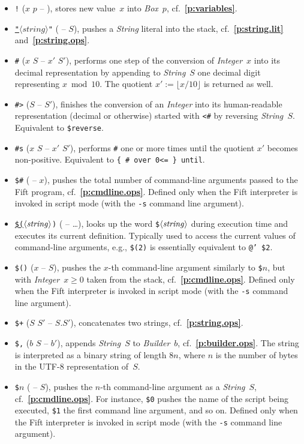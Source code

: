 \documentclass[12pt,oneside]{article}
\def\refpoint#1{{\rm\textbf{\ref{#1}}}}
\let\ptref=\refpoint
\begin{document}
\begin{itemize}
\item {\tt !} ($x$ $p$ -- ), stores new value~$x$ into {\em Box\/}~$p$, cf.~\ptref{p:variables}.
\item {\tt\underline{"}$\langle\textit{string}\rangle$"} ( -- $S$), pushes a {\em String\/} literal into the stack, cf.~\ptref{p:string.lit} and~\ptref{p:string.ops}.
\item {\tt \#} ($x$ $S$ -- $x'$ $S'$), performs one step of the conversion of {\em Integer\/}~$x$ into its decimal representation by appending to {\em String\/}~$S$ one decimal digit representing $x\bmod10$. The quotient $x':=\lfloor x/10\rfloor$ is returned as well.
\item {\tt \#>} ($S$ -- $S'$), finishes the conversion of an {\em Integer\/} into its human-readable representation (decimal or otherwise) started with {\tt <\#} by reversing {\em String~$S$}. Equivalent to {\tt \$reverse}.
\item {\tt \#s} ($x$ $S$ -- $x'$ $S'$), performs {\tt \#} one or more times until the quotient $x'$ becomes non-positive. Equivalent to {\tt \{ \# over 0<= \} until}.
\item {\tt \$\#} ( -- $x$), pushes the total number of command-line arguments passed to the Fift program, cf.~\ptref{p:cmdline.ops}. Defined only when the Fift interpreter is invoked in script mode (with the {\tt -s} command line argument).
\item {\tt\underline{\$(}$\langle\textit{string\/}\rangle$)} ( -- \dots), looks up the word {\tt \$$\langle\textit{string\/}\rangle$} during execution time and executes its current definition. Typically used to access the current values of command-line arguments, e.g., {\tt \$(2)} is essentially equivalent to {\tt @' \$2}.
\item {\tt \$()} ($x$ -- $S$), pushes the $x$-th command-line argument similarly to {\tt \$$n$}, but with {\em Integer\/}~$x\geq0$ taken from the stack, cf.~\ptref{p:cmdline.ops}. Defined only when the Fift interpreter is invoked in script mode (with the {\tt -s} command line argument).
\item {\tt \$+} ($S$ $S'$ -- $S.S'$), concatenates two strings, cf.~\ptref{p:string.ops}.
\item {\tt \$,} ($b$ $S$ -- $b'$), appends {\em String\/}~$S$ to {\em Builder\/}~$b$, cf.~\ptref{p:builder.ops}. The string is interpreted as a binary string of length $8n$, where $n$ is the number of bytes in the UTF-8 representation of~$S$.
\item {\tt \$$n$} ( -- $S$), pushes the $n$-th command-line argument as a {\em String}~$S$, cf.~\ptref{p:cmdline.ops}. For instance, {\tt \$0} pushes the name of the script being executed, {\tt \$1} the first command line argument, and so on. Defined only when the Fift interpreter is invoked in script mode (with the {\tt -s} command line argument).

\end{itemize}
\end{document}
